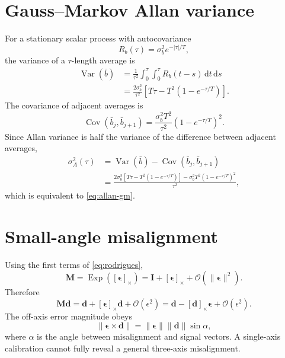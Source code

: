 \documentclass[11pt,oneside,headings=big]{scrreprt}
\newcommand{\Exp}{\operatorname{Exp}}
\newcommand{\skewmat}[1]{\left[#1\right]_{\times}}
\newcommand{\Cov}{\operatorname{Cov}}
\newcommand{\Var}{\operatorname{Var}}
\newcommand{\dd}{\,\mathrm{d}}
\newcommand{\vect}[1]{\bm{#1}}
\newcommand{\mat}[1]{\bm{#1}}
\begin{document}
    \section{Gauss--Markov Allan variance}
    For a stationary scalar process with autocovariance
    \begin{equation}
        R_b(\tau)=\sigma_b^2e^{-\lvert\tau\rvert/T},
    \end{equation}
    the variance of a \(\tau\)-length average is
    \begin{align}
        \Var(\bar b)
        &=\frac{1}{\tau^2}\int_0^\tau\!\int_0^\tau
        R_b(t-s)\dd t\dd s\\
        &=\frac{2\sigma_b^2}{\tau^2}
        \left[T\tau-T^2(1-e^{-\tau/T})\right].
        \label{eq:gm-mean-var}
    \end{align}
    The covariance of adjacent averages is
    \begin{equation}
        \Cov(\bar b_j,\bar b_{j+1})
        =\frac{\sigma_b^2T^2}{\tau^2}(1-e^{-\tau/T})^2.
        \label{eq:gm-adjacent-cov}
    \end{equation}
    Since Allan variance is half the variance of the difference between adjacent
    averages,
    \begin{align}
        \sigma_A^2(\tau)
        &=\Var(\bar b)-\Cov(\bar b_j,\bar b_{j+1})\\
        &=\frac{
            2\sigma_b^2[T\tau-T^2(1-e^{-\tau/T})]
            -\sigma_b^2T^2(1-e^{-\tau/T})^2
        }{\tau^2},
    \end{align}
    which is equivalent to \cref{eq:allan-gm}.


    \section{Small-angle misalignment}
    Using the first terms of \cref{eq:rodrigues},
    \begin{equation}
        \mat M=\Exp(\skewmat{\vect\epsilon})
        =\mat I+\skewmat{\vect\epsilon}+\mathcal O(\lVert\vect\epsilon\rVert^2).
    \end{equation}
    Therefore
    \begin{equation}
        \mat M\vect d
        =\vect d+\skewmat{\vect\epsilon}\vect d+\mathcal O(\epsilon^2)
        =\vect d-\skewmat{\vect d}\vect\epsilon+\mathcal O(\epsilon^2).
    \end{equation}
    The off-axis error magnitude obeys
    \begin{equation}
        \lVert\vect\epsilon\times\vect d\rVert
        =\lVert\vect\epsilon\rVert\lVert\vect d\rVert\sin\alpha,
    \end{equation}
    where \(\alpha\) is the angle between misalignment and signal vectors. A
    single-axis calibration cannot fully reveal a general three-axis misalignment.
\end{document}
